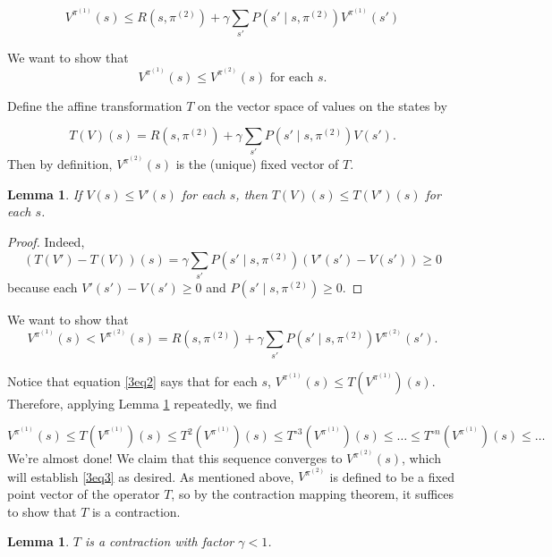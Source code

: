 \documentclass[12pt]{article}
\newtheorem{lemma}[thm]{Lemma}
\theoremstyle{remark}
\begin{document}
\begin{equation}\label{3eq2}
V^{\pi^{(1)}} (s) \leq R(s, \pi^{(2)}) + \gamma \sum_{s'} P(s' \mid s, \pi^{(2)} ) V^{\pi^{(1)}}(s')
\end{equation}

We want to show that
\begin{equation}\label{3eq3}
V^{\pi^{(1)}}(s) \leq V^{\pi^{(2)}}(s) \text{ for each }s.
\end{equation}


Define the affine transformation $T$ on the vector space of values on the states by

\[
T(V)(s) = R(s, \pi^{(2)}) + \gamma \sum_{s'} P(s' \mid s, \pi^{(2)} ) V(s').
\]
Then by definition, $V^{\pi^{(2)}}(s)$ is the (unique) fixed vector of $T$.


\begin{lemma}\label{3lem1}
If $V(s) \leq V'(s)$ for each $s$, then $T(V)(s) \leq T(V')(s)$ for each $s$.
\end{lemma}


\begin{proof}

Indeed,
\[
(T(V')-T(V))(s) = \gamma \sum_{s'} P(s' \mid s, \pi^{(2)}) (V'(s') - V(s')) \geq 0
\]
because each $V'(s')-V(s') \geq 0$ and $P(s' \mid s, \pi^{(2)}) \geq 0$.

\end{proof}


We want to show that
\begin{equation}\label{3eq3}
V^{\pi^{(1)}}(s) < V^{\pi^{(2)}} (s) = R(s, \pi^{(2)}) + \gamma \sum_{s'} P(s' \mid s, \pi^{(2)} ) V^{\pi^{(2)}}(s').
\end{equation}


Notice that equation \eqref{3eq2} says that for each $s$, $V^{\pi^{(1)}}(s) \leq T(V^{\pi^{(1)}})(s)$. Therefore, applying Lemma \ref{3lem1} repeatedly, we find

\[
V^{\pi^{(1)}}(s) \leq T(V^{\pi^{(1)}})(s) \leq T^2(V^{\pi^{(1)}})(s) \leq T^{\circ 3}(V^{\pi^{(1)}})(s) \leq \ldots \leq T^{\circ n}(V^{\pi^{(1)}})(s) \leq \ldots
\]
We're almost done! We claim that this sequence converges to $V^{\pi^{(2)}}(s)$, which will establish \eqref{3eq3} as desired. As mentioned above, $V^{\pi^{(2)}}$ is defined to be a fixed point vector of the operator $T$, so by the contraction mapping theorem, it suffices to show that $T$ is a contraction.


\begin{lemma}

$T$ is a contraction with factor $\gamma < 1$.

\end{lemma}
\end{document}
